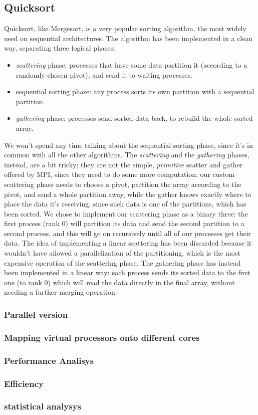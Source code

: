 \subsection{Quicksort}
Quicksort, like Mergesort, is a very popular sorting algorithm, the most widely used on sequential architectures. The algorithm has been implemented in a clean way, separating three logical phases:
\begin{itemize}
	\item{\textit{scattering} phase: processes that have some data partition it (according to a randomly-chosen pivot), and send it to waiting processes.}
	\item{sequential sorting phase: any process sorts its own partition with a sequential partition.}
	\item{\textit{gathering} phase: processes send sorted data back, to rebuild the whole sorted array.}
\end{itemize}
We won't spend any time talking about the sequential sorting phase, since it's in common with all the other algorithms.
The \textit{scattering} and the \textit{gathering} phases, instead, are a bit tricky; they are not the simple, \textit{primitive} scatter and gather offered by MPI, since they need to do some more computation: our custom scattering phase needs to choose a pivot, partition the array according to the pivot, and send a whole partition away, while the gather knows exactly where to place the data it's receiving, since such data is one of the partitions, which has been sorted.
We chose to implement our scattering phase as a binary three: the first process (rank 0) will partition its data and send the second partition to a second process, and this will go on recursively until all of our processes get their data. The idea of implementing a linear scattering has been discarded because it wouldn't have allowed a parallelization of the partitioning, which is the most expensive operation of the scattering phase.
The gathering phase has instead been implemented in a linear way: each process sends its sorted data to the first one (to rank 0) which will read the data directly in the final array, without needing a further merging operation.

\subsubsection*{Parallel version}
\subsubsection*{Mapping virtual processors onto different cores} 
\subsubsection*{Performance Analisys} 
\subsubsection*{Efficiency} 
\subsubsection*{statistical analysys}

